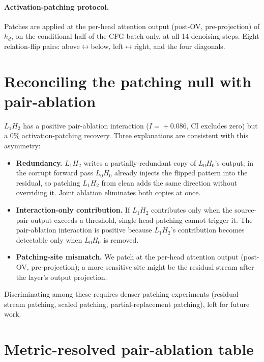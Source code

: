 \documentclass{article}
\theoremstyle{plain}
\theoremstyle{definition}
\begin{document}
\paragraph{Activation-patching protocol.} Patches are applied at the per-head attention output (post-OV, pre-projection) of $h_d$, on the conditional half of the CFG batch only, at all 14 denoising steps. Eight relation-flip pairs: above$\leftrightarrow$below, left$\leftrightarrow$right, and the four diagonals.

\section{Reconciling the patching null with pair-ablation}
\label{app:patching-null}

$L_1H_2$ has a positive pair-ablation interaction ($I\!=\!+0.086$, CI excludes zero) but a $0\%$ activation-patching recovery. Three explanations are consistent with this asymmetry:
\begin{itemize}
\item \textbf{Redundancy.} $L_1H_2$ writes a partially-redundant copy of $L_0H_0$'s output; in the corrupt forward pass $L_0H_0$ already injects the flipped pattern into the residual, so patching $L_1H_2$ from clean adds the same direction without overriding it. Joint ablation eliminates both copies at once.
\item \textbf{Interaction-only contribution.} If $L_1H_2$ contributes only when the source-pair output exceeds a threshold, single-head patching cannot trigger it. The pair-ablation interaction is positive because $L_1H_2$'s contribution becomes detectable only when $L_0H_0$ is removed.
\item \textbf{Patching-site mismatch.} We patch at the per-head attention output (post-OV, pre-projection); a more sensitive site might be the residual stream after the layer's output projection.
\end{itemize}
Discriminating among these requires denser patching experiments (residual-stream patching, scaled patching, partial-replacement patching), left for future work.

\section{Metric-resolved pair-ablation table}
\label{app:metric-pairs}
\end{document}
